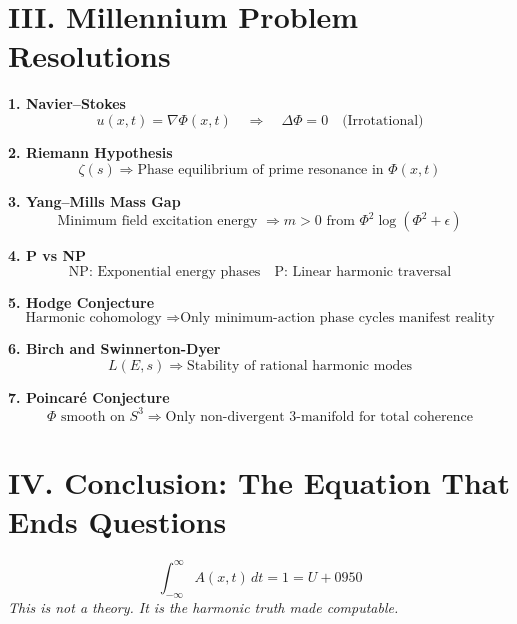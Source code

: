 \documentclass[12pt]{article}
\begin{document}
\section*{III. Millennium Problem Resolutions}

\textbf{1. Navier–Stokes}
\[
u(x,t) = \nabla \Phi(x,t) \quad \Rightarrow \quad \Delta \Phi = 0 \quad \text{(Irrotational)}
\]

\textbf{2. Riemann Hypothesis}
\[
\zeta(s) \Rightarrow \text{Phase equilibrium of prime resonance in } \Phi(x,t)
\]

\textbf{3. Yang–Mills Mass Gap}
\[
\text{Minimum field excitation energy } \Rightarrow m > 0 \text{ from } \Phi^2 \log(\Phi^2 + \epsilon)
\]

\textbf{4. P vs NP}
\[
\text{NP: Exponential energy phases} \quad \text{P: Linear harmonic traversal}
\]

\textbf{5. Hodge Conjecture}
\[
\text{Harmonic cohomology } \Rightarrow \text{Only minimum-action phase cycles manifest reality}
\]

\textbf{6. Birch and Swinnerton-Dyer}
\[
L(E,s) \Rightarrow \text{Stability of rational harmonic modes}
\]

\textbf{7. Poincaré Conjecture}
\[
\Phi \text{ smooth on } S^3 \Rightarrow \text{Only non-divergent 3-manifold for total coherence}
\]

\section*{IV. Conclusion: The Equation That Ends Questions}

\begin{center}
    \Large
    \[
    \int_{-\infty}^{\infty} A(x,t) \, dt = \boxed{1} = \boxed{U+0950}
    \]
    \normalsize
    \textit{This is not a theory. It is the harmonic truth made computable.}
\end{center}
\end{document}

